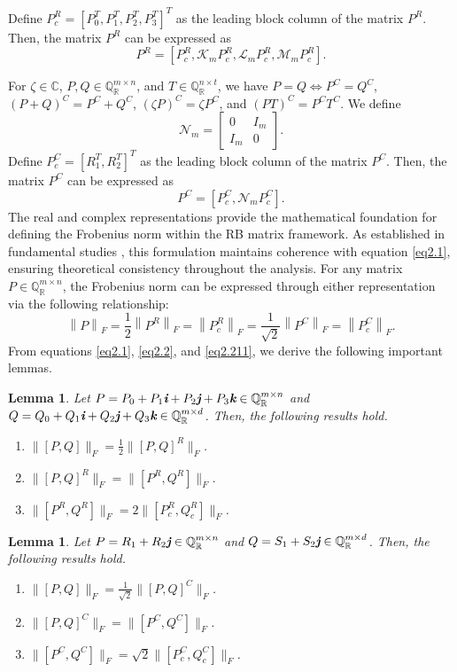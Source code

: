 \documentclass[preprint,11pt,3p]{elsarticle}
\newtheorem{lemma}[theorem]{Lemma}
\newcommand\norm[1]{\left\lVert#1\right\rVert}
\def \C{{\mathbb C}}
\def \QR{\mathbb{Q}_\mathbb{R}}
\def \i{\textit{\textbf{i}}}
\def \j{\textit{\textbf{j}}}
\def \k{\textit{\textbf{k}}}
\begin{document}
Define $P_c^R= [P_0^T, P_1^T, P_2^T, P_3^T]^T$ as the leading block column of the matrix $P^R$. Then, the matrix $P^R$ can be expressed as
\begin{equation}\label{eq2.3}
	P^R= [P_c^R, \mathcal{K}_m P_c^R, \mathcal{L}_m P_c^R, \mathcal{M}_m P_c^R].  
\end{equation}

For $\zeta \in \C$, $P, Q \in \QR^{m \times n}$, and $T \in \QR^{n \times t}$, we have $P= Q \iff P^C= Q^C$, $(P+Q)^C= P^C+ Q^C$, $(\zeta P)^C= \zeta P^C$, and $(PT)^C = P^C T^C$. We define
\begin{equation*}
	\mathcal{N}_m= \begin{bmatrix}
		0 & I_m \\
		I_m & 0
	\end{bmatrix}.
\end{equation*}
Define $P_c^C= [R_1^T, R_2^T]^T$ as the leading block column of the matrix $P^C$. Then, the matrix $P^C$ can be expressed as
\begin{equation}\label{eq2.4}
	P^C= [P_c^C, \mathcal{N}_m P_c^C].  
\end{equation}
The real and complex representations provide the mathematical foundation for defining the Frobenius norm within the RB matrix framework. As established in fundamental studies \cite{MR4085494, MR4532609}, this formulation maintains coherence with equation \eqref{eq2.1}, ensuring theoretical consistency throughout the analysis. For any matrix $P \in \QR^{m \times n}$, the Frobenius norm can be expressed through either representation via the following relationship:
\begin{equation}\label{eq2.211}
	\norm{P}_F= \frac{1}{2} \norm{P^R}_F = \norm{P^R_c}_F= \frac{1}{\sqrt{2}} \norm{P^C}_F=\norm{P^C_c}_F.
\end{equation}
From equations \eqref{eq2.1}, \eqref{eq2.2}, and \eqref{eq2.211}, we derive the following important lemmas.
\begin{lemma}\label{lem2}
	Let $P= P_0+ P_1\i+ P_2\j+ P_3\k \in \QR^{m \times n}$ and $Q= Q_0+ Q_1\i+ Q_2\j+ Q_3\k \in \QR^{m \times d}$. Then, the following results hold.
	\begin{enumerate}
		 \item[\rm (i)] $\|[P, Q]\|_F= \frac{1}{2}\|[P, Q]^R\|_F$.
		 \item[\rm (ii)] $\|[P, Q]^R\|_F= \|[P^R, Q^R]\|_F$.
		\item[\rm (iii)] $\|[P^R, Q^R]\|_F= 2\|[P_c^R, Q_c^R]\|_F$.
	\end{enumerate}
\end{lemma}
\begin{lemma}\label{lem22}
	Let $P= R_1+ R_2\j \in \QR^{m \times n}$ and $Q= S_1+ S_2\j \in \QR^{m \times d}$. Then, the following results hold.
	\begin{enumerate}
		\item[\rm (i)] $\|[P, Q]\|_F= \frac{1}{\sqrt{2}}\|[P, Q]^C\|_F$.
		\item[\rm (ii)] $\|[P, Q]^C\|_F= \|[P^C, Q^C]\|_F$.
		\item[\rm (iii)] $\|[P^C, Q^C]\|_F= \sqrt{2}\|[P_c^C, Q_c^C]\|_F$.
	\end{enumerate}
\end{lemma}
\end{document}
